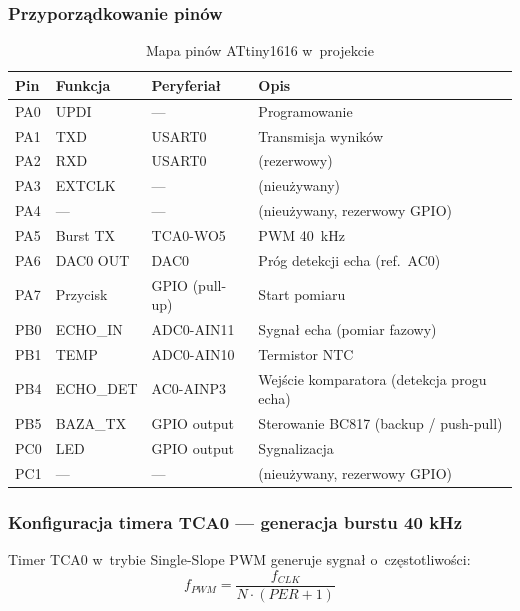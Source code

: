 \documentclass[a4paper,11pt]{article}
\begin{document}
\subsubsection{Przyporządkowanie pinów}

\begin{table}[H]
    \centering
    \caption{Mapa pinów ATtiny1616 w~projekcie}
    \label{tab:pinout}
    \begin{tabular}{llll}
        \toprule
        \textbf{Pin} & \textbf{Funkcja} & \textbf{Peryferiał} & \textbf{Opis} \\
        \midrule
        PA0 & UPDI & --- & Programowanie \\
        PA1 & TXD & USART0 & Transmisja wyników \\
        PA2 & RXD & USART0 & (rezerwowy) \\
        PA3 & EXTCLK & --- & (nieużywany) \\
        PA4 & --- & --- & (nieużywany, rezerwowy GPIO) \\
        PA5 & Burst TX & TCA0-WO5 & PWM \SI{40}{\kilo\hertz} \\
        PA6 & DAC0 OUT & DAC0 & Próg detekcji echa (ref.\ AC0) \\
        PA7 & Przycisk & GPIO (pull-up) & Start pomiaru \\
        PB0 & ECHO\_IN & ADC0-AIN11 & Sygnał echa (pomiar fazowy) \\
        PB1 & TEMP & ADC0-AIN10 & Termistor NTC \\
        PB4 & ECHO\_DET & AC0-AINP3 & Wejście komparatora (detekcja progu echa) \\
        PB5 & BAZA\_TX & GPIO output & Sterowanie BC817 (backup / push-pull) \\
        PC0 & LED & GPIO output & Sygnalizacja \\
        PC1 & --- & --- & (nieużywany, rezerwowy GPIO) \\
        \bottomrule
    \end{tabular}
\end{table}

\subsubsection{Konfiguracja timera TCA0 --- generacja burstu 40 kHz}

Timer TCA0 w~trybie Single-Slope PWM generuje sygnał o~częstotliwości:
\begin{equation}
    f_{PWM} = \frac{f_{CLK}}{N \cdot (PER + 1)}
    \label{eq:pwm_freq}
\end{equation}
\end{document}
